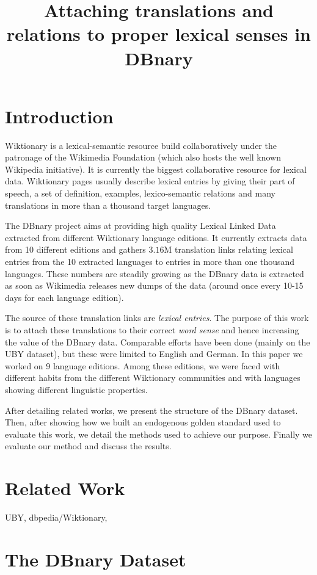\documentclass[10pt, a4paper]{article}
\title{Attaching translations and relations to proper lexical senses in DBnary}
\begin{document}
\maketitleabstract

\section{Introduction}

 Wiktionary is a lexical-semantic resource build collaboratively under the patronage of the Wikimedia Foundation (which also hosts the well known Wikipedia initiative). It is currently the biggest collaborative resource for lexical data. Wiktionary pages usually describe lexical entries by giving their part of speech, a set of definition, examples, lexico-semantic relations and many translations in more than a thousand target languages.

The DBnary project \cite{serasset:dbnary-swj} aims at providing high quality Lexical Linked Data extracted from different Wiktionary language editions. It currently extracts data from 10 different editions and gathers $3.16$M translation links relating lexical entries from the 10 extracted languages to entries in more than one thousand languages. These numbers are steadily growing as the DBnary data is extracted as soon as Wikimedia releases new dumps of the data (around once every 10-15 days for each language edition).

The source of these translation links are \emph{lexical entries}. The purpose of this work is to attach these translations to their correct \emph{word sense} and hence increasing the value of the DBnary data. Comparable efforts have been done (mainly on the UBY dataset), but these were limited to English and German. In this paper we worked on 9 language editions. Among these editions, we were faced with different habits from the different Wiktionary communities and with languages showing different linguistic properties. 

After detailing related works, we present the structure of the DBnary dataset. Then, after showing how we built an endogenous golden standard used to evaluate this work, we detail the methods used to achieve our purpose. Finally we evaluate our method and discuss the results.

\section{Related Work}

UBY, dbpedia/Wiktionary, 

\section{The DBnary Dataset}
\end{document}
